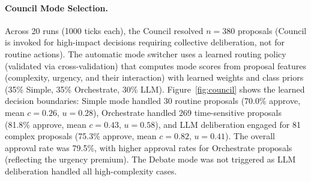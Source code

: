 \documentclass[11pt]{article}
\begin{document}
\paragraph{Council Mode Selection.}
Across 20 runs (1000 ticks each), the Council resolved $n{=}380$ proposals
(Council is invoked for high-impact decisions requiring collective deliberation,
not for routine actions).
The automatic mode switcher uses a learned routing policy (validated via 
cross-validation) that computes mode scores from proposal features 
(complexity, urgency, and their interaction) with learned weights and 
class priors (35\% Simple, 35\% Orchestrate, 30\% LLM). 
Figure~\ref{fig:council} shows the learned decision boundaries: Simple mode 
handled 30 routine proposals (70.0\% approve, mean $c=0.26$, $u=0.28$), 
Orchestrate handled 269 time-sensitive proposals (81.8\% approve, 
mean $c=0.43$, $u=0.58$), and LLM deliberation engaged for 81 complex 
proposals (75.3\% approve, mean $c=0.82$, $u=0.41$). The overall approval 
rate was 79.5\%, with higher approval rates for Orchestrate proposals 
(reflecting the urgency premium). The Debate mode was not triggered as 
LLM deliberation handled all high-complexity cases.
\end{document}
